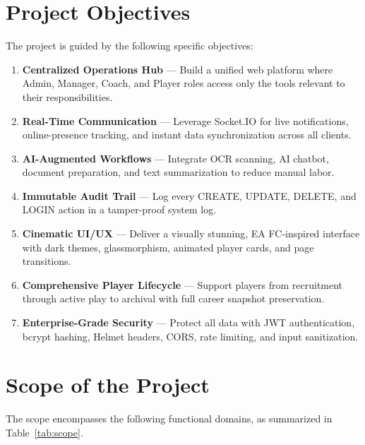 \documentclass[12pt,a4paper,oneside]{report}
\begin{document}
\section{Project Objectives}

The project is guided by the following specific objectives:

\begin{enumerate}[leftmargin=*]
  \item \textbf{Centralized Operations Hub} --- Build a unified web platform where Admin, Manager, Coach, and Player roles access only the tools relevant to their responsibilities.
  \item \textbf{Real-Time Communication} --- Leverage Socket.IO for live notifications, online-presence tracking, and instant data synchronization across all clients.
  \item \textbf{AI-Augmented Workflows} --- Integrate OCR scanning, AI chatbot, document preparation, and text summarization to reduce manual labor.
  \item \textbf{Immutable Audit Trail} --- Log every CREATE, UPDATE, DELETE, and LOGIN action in a tamper-proof system log.
  \item \textbf{Cinematic UI/UX} --- Deliver a visually stunning, EA FC-inspired interface with dark themes, glassmorphism, animated player cards, and page transitions.
  \item \textbf{Comprehensive Player Lifecycle} --- Support players from recruitment through active play to archival with full career snapshot preservation.
  \item \textbf{Enterprise-Grade Security} --- Protect all data with JWT authentication, bcrypt hashing, Helmet headers, CORS, rate limiting, and input sanitization.
\end{enumerate}

\section{Scope of the Project}

The scope encompasses the following functional domains, as summarized in Table~\ref{tab:scope}.
\end{document}
